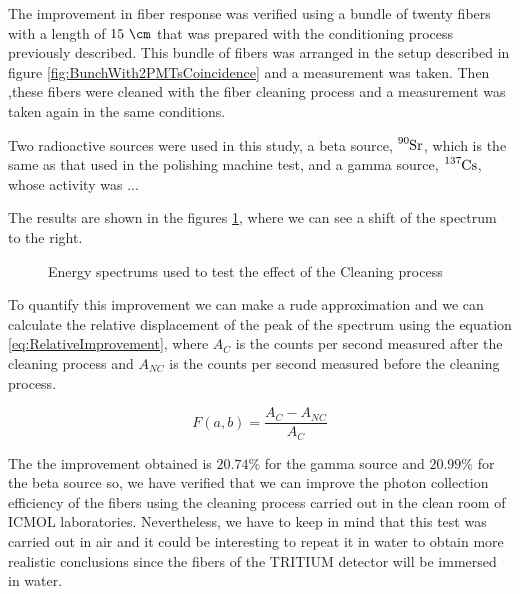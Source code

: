 The improvement in fiber response was verified using a bundle of twenty fibers with a length of $15~\cm$ that was prepared with the conditioning process previously described. This bundle of fibers was arranged in the setup described in figure \ref{fig:BunchWith2PMTsCoincidence} and a measurement was taken. Then ,these fibers were cleaned with the fiber cleaning process and a measurement was taken again in the same conditions.

Two radioactive sources were used in this study, a beta source, $\ce{^{90}Sr}$, which is the same as that used in the polishing machine test, and a gamma source, $\ce{^{137}Cs}$, whose activity was ...

The results are shown in the figures \ref{fig:ResultsOfCleaningProcess}, where we can see a shift of the spectrum to the right. 

\begin{figure}[htbp]
 \centering
    \newline
 \caption{Energy spectrums used to test the effect of the Cleaning process}
 \label{fig:ResultsOfCleaningProcess}
\end{figure}

To quantify this improvement we can make a rude approximation and we can calculate the relative displacement of the peak of the spectrum using the equation \ref{eq:RelativeImprovement}, where $A_{C}$ is the counts per second measured after the cleaning process and $A_{NC}$ is the counts per second measured before the cleaning process.

\begin{equation}
F(a,b)=\frac{A_{C}-A_{NC}}{A_{C}}
\label{eq:RelativeImprovement}
\end{equation}

The the improvement obtained is $20.74\%$ for the gamma source and $20.99\%$ for the beta source so, we have verified that we can improve the photon collection efficiency of the fibers using the cleaning process carried out in the clean room of ICMOL laboratories. Nevertheless, we have to keep in mind that this test was carried out in air and it could be interesting to repeat it in water to obtain more realistic conclusions since the fibers of the TRITIUM detector will be immersed in water.
